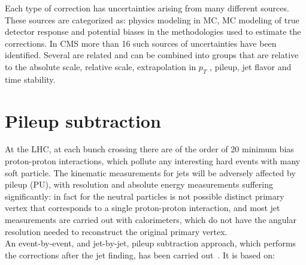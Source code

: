 Each type of correction has uncertainties arising from many different sources.
These sources are categorized as: physics modeling in MC, MC modeling of true detector response and potential biases in the methodologies used to estimate the corrections. In CMS more than 16 such sources of uncertainties have been identified. Several are
related and can be combined into groups that are relative to the absolute scale, relative
scale, extrapolation in $p_T$ , pileup, jet flavor and time stability.

\section{Pileup subtraction}
At the LHC,  at each bunch crossing there are of the order of 20 minimum bias proton-proton interactions, which pollute any interesting hard events with many soft particle. The kinematic measurements for jets will be adversely affected by pileup (PU), with resolution and absolute energy measurements
suffering significantly: in fact for the  neutral particles is not possible distinct primary vertex that corresponds to a single
proton-proton interaction,  and most jet measurements are carried out with calorimeters, which do not have the angular
resolution needed to reconstruct the original primary vertex.\\
An event-by-event, and jet-by-jet, pileup subtraction approach, which performs the corrections after the jet finding,  has been
carried out~\cite{Cacciari:2007fd}.  It is based on:
